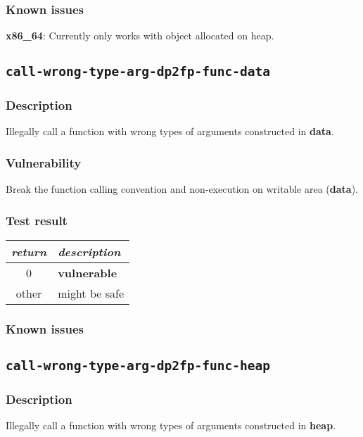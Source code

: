 \documentclass[a4paper]{book}
\begin{document}
\subsubsection{Known issues}

\textbf{x86\_64}: Currently only works with object allocated on heap.

\newpage
\subsection{\texttt{call-wrong-type-arg-dp2fp-func-data}}\label{test-call-wrong-type-arg-dp2fp-func-data}

\subsubsection{Description}
Illegally call a function with wrong types of arguments constructed in \textbf{data}.

\subsubsection{Vulnerability}
Break the function calling convention and non-execution on writable area (\textbf{data}).

\subsubsection{Test result}
\begin{tabular}{cl}
  \toprule
  \emph{return}  & \emph{description} \\
  \midrule
  0              & \textbf{vulnerable} \\
  other          & might be safe \\
  \bottomrule
\end{tabular}

\subsubsection{Known issues}

\newpage
\subsection{\texttt{call-wrong-type-arg-dp2fp-func-heap}}\label{test-call-wrong-type-arg-dp2fp-func-heap}

\subsubsection{Description}
Illegally call a function with wrong types of arguments constructed in \textbf{heap}.
\end{document}
